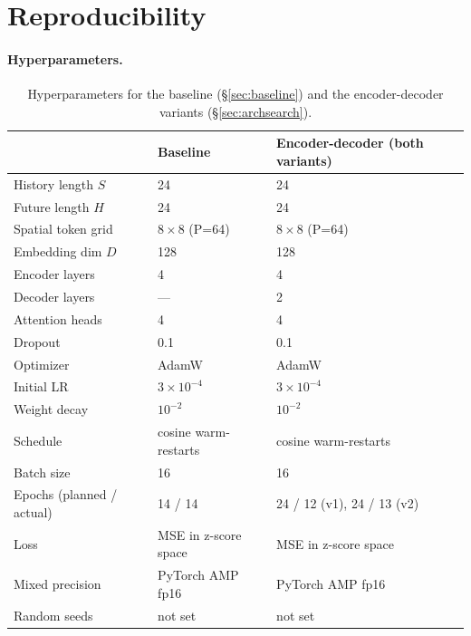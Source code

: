 
\section{Reproducibility}
\label{app:repro}

\paragraph{Hyperparameters.}

\begin{table}[h]
\centering\small
\caption{Hyperparameters for the baseline (\S\ref{sec:baseline}) and the encoder-decoder variants (\S\ref{sec:archsearch}).}
\label{tab:hparams}
\begin{tabular}{@{}lll@{}}
\toprule
& Baseline & Encoder-decoder (both variants) \\
\midrule
History length $S$            & 24                       & 24 \\
Future length $H$              & 24                       & 24 \\
Spatial token grid             & $8\times 8$ (P=64)       & $8\times 8$ (P=64) \\
Embedding dim $D$              & 128                      & 128 \\
Encoder layers                 & 4                        & 4 \\
Decoder layers                 & ---                      & 2 \\
Attention heads                & 4                        & 4 \\
Dropout                        & 0.1                      & 0.1 \\
Optimizer                      & AdamW \citep{loshchilov2019adamw} & AdamW \\
Initial LR                     & $3\times 10^{-4}$        & $3\times 10^{-4}$ \\
Weight decay                   & $10^{-2}$                & $10^{-2}$ \\
Schedule                       & cosine warm-restarts \citep{loshchilov2017sgdr} & cosine warm-restarts \\
Batch size                     & 16                       & 16 \\
Epochs (planned / actual)      & 14 / 14                  & 24 / 12 (v1), 24 / 13 (v2) \\
Loss                           & MSE in z-score space     & MSE in z-score space \\
Mixed precision                & PyTorch AMP fp16          & PyTorch AMP fp16 \\
Random seeds                   & not set                  & not set \\
\bottomrule
\end{tabular}
\end{table}

